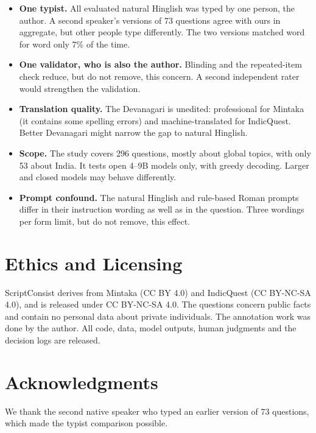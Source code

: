 \documentclass[11pt]{article}
\newcommand{\Rom}{rule-based Roman}
\newcommand{\Hng}{natural Hinglish}
\begin{document}
\begin{itemize}\setlength\itemsep{0pt}
\item \textbf{One typist.} All evaluated \Hng{} was typed by one person, the author. A second speaker's versions of 73 questions agree with ours in aggregate, but other people type differently. The two versions matched word for word only 7\% of the time.
\item \textbf{One validator, who is also the author.} Blinding and the repeated-item check reduce, but do not remove, this concern. A second independent rater would strengthen the validation.
\item \textbf{Translation quality.} The Devanagari is unedited: professional for Mintaka (it contains some spelling errors) and machine-translated for IndicQuest. Better Devanagari might narrow the gap to \Hng{}.
\item \textbf{Scope.} The study covers 296 questions, mostly about global topics, with only 53 about India. It tests open 4--9B models only, with greedy decoding. Larger and closed models may behave differently.
\item \textbf{Prompt confound.} The \Hng{} and \Rom{} prompts differ in their instruction wording as well as in the question. Three wordings per form limit, but do not remove, this effect.
\end{itemize}

\section*{Ethics and Licensing}
ScriptConsist derives from Mintaka (CC BY 4.0) and IndicQuest (CC BY-NC-SA 4.0), and is released under CC BY-NC-SA 4.0.
The questions concern public facts and contain no personal data about private individuals.
The annotation work was done by the author.
All code, data, model outputs, human judgments and the decision logs are released.

\section*{Acknowledgments}
We thank the second native speaker who typed an earlier version of 73 questions, which made the typist comparison possible.


\end{document}
